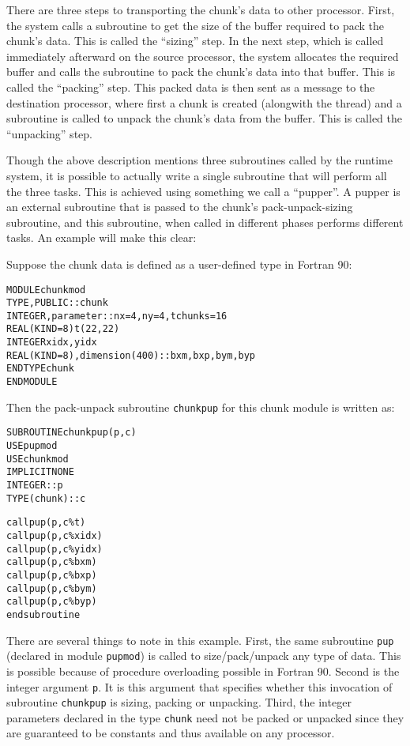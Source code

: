\documentclass[10pt]{article}
\begin{document}
There are three steps to transporting the chunk's data to other processor.
First, the system calls a subroutine to get the size of the buffer required to
pack the chunk's data. This is called the ``sizing'' step. In the next step,
which is called immediately afterward on the source processor, the system
allocates the required buffer and calls the subroutine to pack the chunk's data
into that buffer. This is called the ``packing'' step. This packed data is then
sent as a message to the destination processor, where first a chunk is created
(alongwith the thread) and a subroutine is called to unpack the chunk's data
from the buffer. This is called the ``unpacking'' step.

Though the above description mentions three subroutines called by the \ampi{}
runtime system, it is possible to actually write a single subroutine that will
perform all the three tasks. This is achieved using something we call a
``pupper''. A pupper is an external subroutine that is passed to the chunk's
pack-unpack-sizing subroutine, and this subroutine, when called in different
phases performs different tasks. An example will make this clear:

Suppose the chunk data is defined as a user-defined type in Fortran 90:

\begin{alltt}
MODULE chunkmod
  TYPE, PUBLIC :: chunk
      INTEGER , parameter :: nx=4, ny=4, tchunks=16
      REAL(KIND=8) t(22,22)
      INTEGER xidx, yidx
      REAL(KIND=8), dimension(400):: bxm, bxp, bym, byp
  END TYPE chunk
END MODULE
\end{alltt}

Then the pack-unpack subroutine \texttt{chunkpup} for this chunk module is
written as:

\begin{alltt}
SUBROUTINE chunkpup(p, c)
  USE pupmod
  USE chunkmod
  IMPLICIT NONE
  INTEGER :: p
  TYPE(chunk) :: c

  call pup(p, c\%t)
  call pup(p, c\%xidx)
  call pup(p, c\%yidx)
  call pup(p, c\%bxm)
  call pup(p, c\%bxp)
  call pup(p, c\%bym)
  call pup(p, c\%byp)
end subroutine
\end{alltt}

There are several things to note in this example. First, the same subroutine
\texttt{pup} (declared in module \texttt{pupmod}) is called to size/pack/unpack
any type of data. This is possible because of procedure overloading possible in
Fortran 90. Second is the integer argument \texttt{p}. It is this argument that
specifies whether this invocation of subroutine \texttt{chunkpup} is sizing,
packing or unpacking. Third, the integer parameters declared in the type
\texttt{chunk} need not be packed or unpacked since they are guaranteed to be
constants and thus available on any processor.
\end{document}
